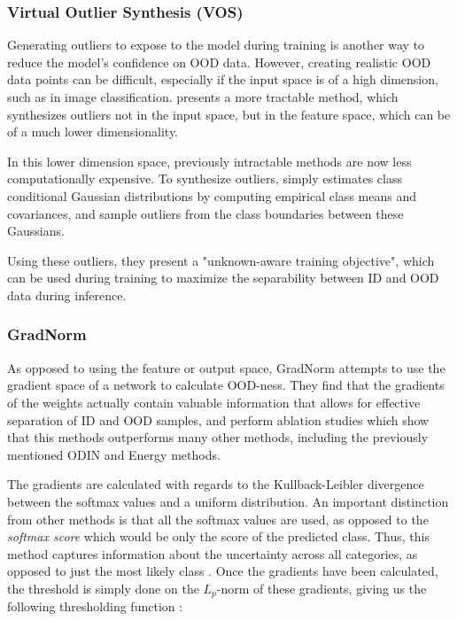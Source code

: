 \documentclass[UKenglish]{uiomasterthesis} %
\theoremstyle{definition}
\begin{document}
\subsubsection{Virtual Outlier Synthesis (VOS)}

Generating outliers to expose to the model during training is another way to reduce the model's confidence on OOD data. However, creating realistic OOD data points can be difficult, especially if the input space is of a high dimension, such as in image classification. \cite{vos} presents a more tractable method, which synthesizes outliers not in the input space, but in the feature space, which can be of a much lower dimensionality.

In this lower dimension space, previously intractable methods are now less computationally expensive. To synthesize outliers, \cite{vos} simply estimates class conditional Gaussian distributions by computing empirical class means and covariances, and sample outliers from the class boundaries between these Gaussians.

Using these outliers, they present a "unknown-aware training objective", which can be used during training to maximize the separability between ID and OOD data during inference.
\\

\subsubsection{GradNorm}

As opposed to using the feature or output space, GradNorm \cite{gradnorm} attempts to use the gradient space of a network to calculate OOD-ness. They find that the gradients of the weights actually contain valuable information that allows for effective separation of ID and OOD samples, and perform ablation studies which show that this methods outperforms many other methods, including the previously mentioned ODIN and Energy methods.

The gradients are calculated with regards to the Kullback-Leibler divergence between the softmax values and a uniform distribution. An important distinction from other methods is that all the softmax values are used, as opposed to the {\it softmax score} which would be only the score of the predicted class. Thus, this method captures information about the uncertainty across all categories, as opposed to just the most likely class \cite[3]{gradnorm}. Once the gradients have been calculated, the threshold is simply done on the $L_p$-norm of these gradients, giving us the following thresholding function \cite{gradnorm}:
\end{document}
